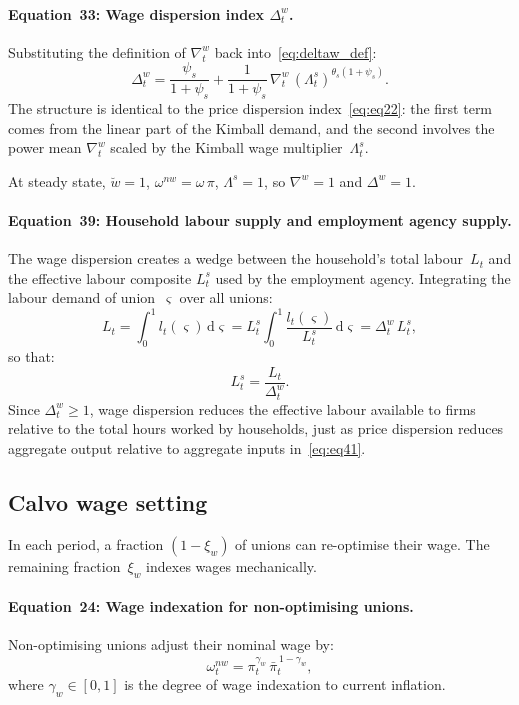 \documentclass[11pt,a4paper]{article}
\newcommand{\dd}{\mathrm{d}}
\newcommand{\bbar}[1]{\bar{#1}}
\begin{document}
\paragraph{Equation~33: Wage dispersion index $\Delta^w_t$.}
Substituting the definition of $\nabla^w_t$ back
into~\eqref{eq:deltaw_def}:
\begin{equation}\label{eq:eq33}\tag{Eq.~33}
  \boxed{
  \Delta^w_t = \frac{\psi_s}{1+\psi_s}
  + \frac{1}{1+\psi_s}\,\nabla^w_t\,
    (\Lambda^s_t)^{\theta_s(1+\psi_s)}.}
\end{equation}
The structure is identical to the price dispersion
index~\eqref{eq:eq22}: the first term comes from the linear part of
the Kimball demand, and the second involves the power mean $\nabla^w_t$
scaled by the Kimball wage multiplier~$\Lambda^s_t$.

At steady state, $\breve w=1$, $\omega^{nw}=\omega\,\pi$, $\Lambda^s=1$,
so $\nabla^w = 1$ and $\Delta^w = 1$.

\paragraph{Equation~39: Household labour supply and employment agency supply.}
The wage dispersion creates a wedge between the household's total
labour~$L_t$ and the effective labour composite $L^s_t$ used by the
employment agency. Integrating the labour demand of
union~$\varsigma$ over all unions:
\[
  L_t
  = \int_0^1 l_t(\varsigma)\,\dd\varsigma
  = L^s_t\!\int_0^1 \frac{l_t(\varsigma)}{L^s_t}\,\dd\varsigma
  = \Delta^w_t\,L^s_t,
\]
so that:
\begin{equation}\label{eq:eq39}\tag{Eq.~39}
  \boxed{L^s_t = \frac{L_t}{\Delta^w_t}.}
\end{equation}
Since $\Delta^w_t \geq 1$, wage dispersion reduces the effective
labour available to firms relative to the total hours worked by
households, just as price dispersion reduces aggregate output relative
to aggregate inputs in~\eqref{eq:eq41}.

\subsection{Calvo wage setting}

In each period, a fraction $(1-\xi_w)$ of unions can re-optimise their
wage. The remaining fraction~$\xi_w$ indexes wages mechanically.

\paragraph{Equation~24: Wage indexation for non-optimising unions.}
Non-optimising unions adjust their nominal wage by:
\begin{equation}\label{eq:eq24}\tag{Eq.~24}
  \boxed{
  \omega^{nw}_t = \pi_t^{\gamma_w}\,\bbar\pi_t^{\,1-\gamma_w},}
\end{equation}
where $\gamma_w \in [0,1]$ is the degree of wage indexation to current
inflation.
\end{document}
